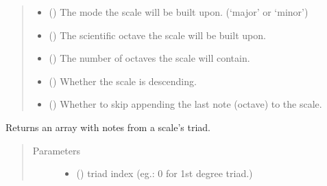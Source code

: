 \documentclass[letterpaper,10pt,english]{sphinxmanual}
\begin{document}
\begin{fulllineitems}
\begin{fulllineitems}
\begin{quote}
\begin{description}
\begin{itemize}
\item {} 
 () \textendash{} The mode the scale will be built upon.
(‘major’ or ‘minor’)

\item {} 
 () \textendash{} The scientific octave the scale will be built upon.

\item {} 
 () \textendash{} The number of octaves the scale will contain.

\item {} 
 () \textendash{} Whether the scale is descending.

\item {} 
 () \textendash{} Whether to skip appending the last
note (octave) to the scale.

\end{itemize}

\end{description}\end{quote}

\end{fulllineitems}


\begin{fulllineitems}
\label{\detokenize{index:birdears.scale.DiatonicScale.get_triad}}
Returns an array with notes from a scale’s triad.
\begin{quote}\begin{description}
\item[{Parameters}] \leavevmode\begin{itemize}
\item {} 
 () \textendash{} triad index (eg.: 0 for 1st degree triad.)


\end{itemize}
\end{description}
\end{quote}
\end{fulllineitems}
\end{fulllineitems}
\end{document}
